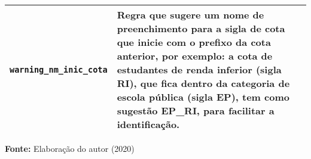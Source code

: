 \begin{table}[ht]
\begin{tabular}{|p{6cm}|p{8cm}|}
\texttt{warning\_nm\_inic\_cota}          & Regra que sugere um nome de preenchimento para a sigla de cota que inicie com o prefixo da cota anterior, por exemplo: a cota de estudantes de renda inferior (sigla RI), que fica dentro da categoria de escola pública (sigla EP), tem como sugestão EP\_RI, para facilitar a identificação.
\\ \hline

\end{tabular}

  \par\medskip\textbf{Fonte:} Elaboração do autor (2020) \par\medskip
\end{table}
